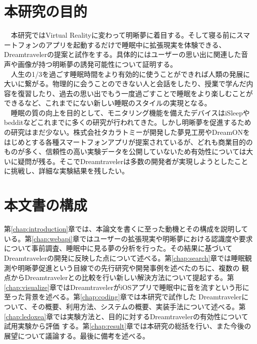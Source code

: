 \section{本研究の目的}
　本研究ではVirtual Realityに変わって明晰夢に着目する。そして寝る前にスマートフォンのアプリを起動するだけで睡眠中に拡張現実を体験できる、Dreamtravelerの提案と試作をする。具体的にはユーザーの思い出に関連した音声や画像が持つ明晰夢の誘発可能性について証明する。\\
　人生の1/3を過ごす睡眠時間をより有効的に使うことができれば人類の発展に大いに繋がる。物理的に会うことのできない人と会話をしたり、授業で学んだ内容を復習したり、過去の思い出でもう一度過ごすことで睡眠をより楽しむことができるなど、これまでにない新しい睡眠のスタイルの実現となる。\\
　睡眠の質の向上を目的として、モニタリング機能を備えたデバイスはiSleep\cite{iSleep}やbeddit\cite{beddit}などこれまでに多くの研究が行われてきた。しかし明晰夢を促進するための研究はまだ少ない。株式会社タカラトミーが開発した夢見工房\cite{takaratomi}やDreamON\cite{dreamOn}をはじめとする各種スマートフォンアプリが提案されているが、どれも商業目的のものが多く、信頼性の高い実験データを公開していないため有効性については大いに疑問が残る。そこでDreamtravelerは多数の開発者が実現しようとしたことに挑戦し、詳細な実験結果を残したい。

\section{本文書の構成}
第\ref{chap:introduction}章では、本論文を書くに至った動機とその構成を説明している。第\ref{chap:webapi}章ではユーザーの拡張現実や明晰夢における認識度や要求について事前調査、睡眠中に見る夢の分析を行った。その結果に基づいてDreamtravelerの開発に反映した点について述べる。第\ref{chap:search}章では睡眠観測や明晰夢促進という目線での先行研究や開発事例を述べたのちに、複数の 観点からDreamtravelerとの比較を行い新しい解決方法について提起する。第\ref{chap:visualize}章ではDreamtravelerがiOSアプリで睡眠中に音を流すという形に至った背景を述べる。第\ref{chap:coding}章では本研究で試作した Dreamtravelerについて、その概要、利用方法、システムの概要、実装手法について述べる。第\ref{chap:ledoxea}章では実験方法と、目的に対するDreamtravelerの有効性について試用実験から評価 する。第\ref{chap:result}章では本研究の総括を行い、また今後の展望について議論する。最後に備考を述べる。
